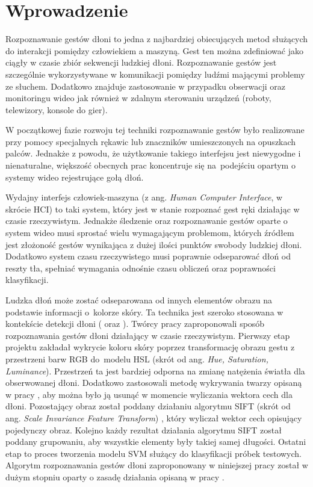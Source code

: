 \chapter{Wprowadzenie}
\label{cha:wprowadzenie}
Rozpoznawanie gestów dłoni to jedna z najbardziej obiecujących metod służących do interakcji pomiędzy człowiekiem a maszyną. Gest ten można zdefiniować jako ciągły w czasie zbiór sekwencji ludzkiej dłoni. Rozpoznawanie gestów jest szczególnie wykorzystywane w komunikacji pomiędzy ludźmi mającymi problemy ze słuchem. Dodatkowo znajduje zastosowanie w przypadku obserwacji oraz monitoringu wideo jak również w zdalnym sterowaniu urządzeń (roboty, telewizory, konsole do gier). 

W początkowej fazie rozwoju tej techniki rozpoznawanie gestów było realizowane przy pomocy specjalnych rękawic lub znaczników umieszczonych na opuszkach palców. Jednakże z powodu, że użytkowanie takiego interfejsu jest niewygodne i nienaturalne, większość obecnych prac koncentruje się na~podejściu opartym o systemy wideo rejestrujące gołą dłoń.

Wydajny interfejs człowiek-maszyna (z ang. \textit{Human Computer Interface}, w skrócie HCI) to taki system, który jest w stanie rozpoznać gest ręki działając w czasie rzeczywistym. Jednakże śledzenie oraz rozpoznawanie gestów oparte o system wideo musi sprostać wielu wymagającym problemom, których źródłem jest złożoność gestów wynikająca z dużej ilości punktów swobody ludzkiej dłoni. Dodatkowo system czasu rzeczywistego musi poprawnie odseparować dłoń od reszty tła, spełniać wymagania odnośnie czasu obliczeń oraz poprawności klasyfikacji.

Ludzka dłoń może zostać odseparowana od innych elementów obrazu na podstawie informacji o~kolorze skóry. Ta technika jest szeroko stosowana w kontekście detekcji dłoni (\cite{Temp1} oraz \cite{Temp2}). Twórcy pracy \cite{SiftBowSvm} zaproponowali sposób rozpoznawania gestów dłoni działający w czasie rzeczywistym. Pierwszy etap projektu zakładał wykrycie koloru skóry poprzez transformację obrazu gestu z przestrzeni barw RGB do~modelu HSL (skrót od ang. \textit{Hue, Saturation, Luminance}). Przestrzeń ta jest bardziej odporna na zmianę natężenia światła dla obserwowanej dłoni. Dodatkowo zastosowali metodę wykrywania twarzy opisaną w pracy \cite{ViolaJonesRobustDetection}, aby można było ją usunąć w momencie wyliczania wektora cech dla dłoni. Pozostający obraz został poddany działaniu algorytmu SIFT (skrót od ang. \textit{Scale Invariance Feature Transform}) \cite{Sift}, który wyliczał wektor cech opisujący pojedynczy obraz. Kolejno każdy rezultat działania algorytmu SIFT został poddany grupowaniu, aby wszystkie elementy były takiej samej długości. Ostatni etap to proces tworzenia modelu SVM służący do klasyfikacji próbek testowych. Algorytm rozpoznawania gestów dłoni zaproponowany w niniejszej pracy został w dużym stopniu oparty o zasadę działania opisaną w pracy \cite{SiftBowSvm}.

